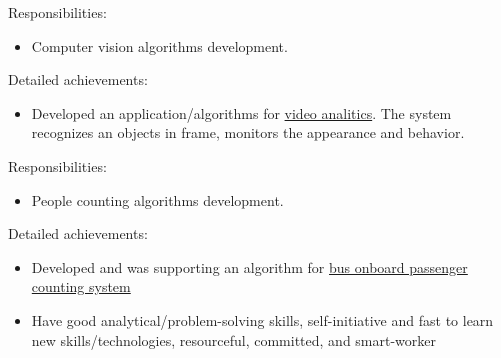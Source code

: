 \documentclass[a4paper,11pt]{memoir}
\begin{document}
{
Responsibilities:
\begin{itemize}
	\item Computer vision algorithms development.
\end{itemize}
Detailed achievements:
\begin{itemize}
	\item Developed an application/algorithms for \href{https://en.videomatrix.ru/vmx-sila/}{video analitics}. The system recognizes an objects in frame, monitors the appearance and behavior.
\end{itemize}
}

{Responsibilities:
\begin{itemize}
	\item People counting algorithms development.
\end{itemize}
Detailed achievements:
\begin{itemize}
	\item Developed and was supporting an algorithm for \href{https://www.youtube.com/watch?v=acb3HhLy3sA}{bus onboard passenger counting system}
\end{itemize}
}

\Sep %

\clearpage %

\userinformation
\framebreak


\begin{itemize}
	\item Have good analytical/problem-solving skills, self-initiative and fast to learn new skills/technologies, resourceful, committed, and smart-worker
\end{itemize}
\Sep



\end{document}
